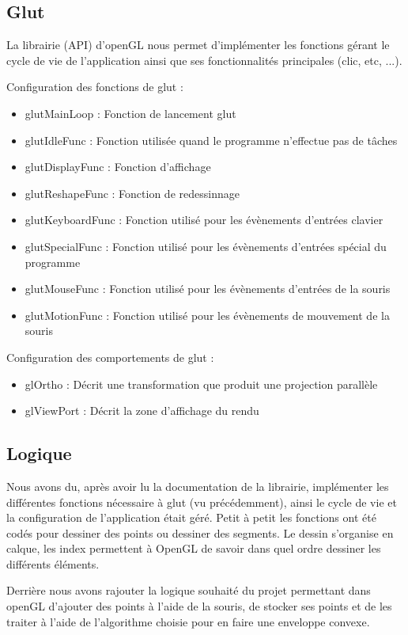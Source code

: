\documentclass[final]{beamer}
\begin{document}
\begin{frame}[t]
\begin{multicols}{3}
\subsection{Glut}

La librairie (API) d'openGL nous permet d'implémenter les fonctions gérant le cycle de vie de l'application ainsi que ses fonctionnalités principales (clic, etc, ...).

Configuration des fonctions de glut :
\begin{itemize}
 \item glutMainLoop : Fonction de lancement glut
 \item glutIdleFunc : Fonction utilisée quand le programme n'effectue pas de tâches
 \item glutDisplayFunc : Fonction d'affichage
 \item glutReshapeFunc : Fonction de redessinnage
 \item glutKeyboardFunc : Fonction utilisé pour les évènements d'entrées clavier
 \item glutSpecialFunc : Fonction utilisé pour les évènements d'entrées spécial du programme
 \item glutMouseFunc : Fonction utilisé pour les évènements d'entrées de la souris
 \item glutMotionFunc : Fonction utilisé pour les évènements de mouvement de la souris
\end{itemize}

Configuration des comportements de glut :
\begin{itemize}
 \item glOrtho : Décrit une transformation que produit une projection parallèle
 \item glViewPort : Décrit la zone d'affichage du rendu
\end{itemize}

\subsection{Logique}
Nous avons du, après avoir lu la documentation de la librairie, implémenter les différentes fonctions nécessaire à glut (vu précédemment), ainsi le cycle de vie et la configuration de l'application était géré.
Petit à petit les fonctions ont été codés pour dessiner des points ou dessiner des segments. Le dessin s'organise en calque, les index permettent à OpenGL de savoir dans quel ordre dessiner les différents éléments.

Derrière nous avons rajouter la logique souhaité du projet permettant dans openGL d'ajouter des points à l'aide de la souris, de stocker ses points et de les traiter à l'aide de l'algorithme choisie pour en faire une enveloppe convexe.


\end{multicols}
\end{frame}
\end{document}
